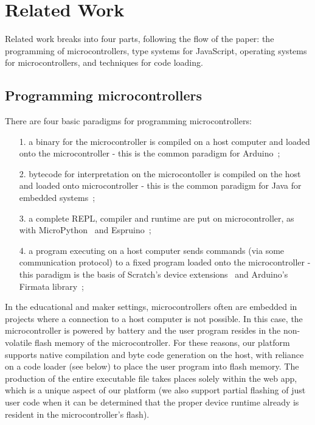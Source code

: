 \section{Related Work}
\label{sec:related}

Related work breaks into four parts, following the
flow of the paper: the programming of microcontrollers, 
type systems for JavaScript, operating systems
for microcontrollers, and techniques for code loading.

\subsection{Programming microcontrollers}

There are four basic paradigms for programming microcontrollers:
\begin{itemize}
\item[1.] a binary for the microcontroller is compiled on a host computer and loaded onto the microcontroller -
this is the common paradigm for Arduino~\cite{buildingArduino2014};
\item[2.] bytecode for interpretation on the microcontoller is compiled on the host and loaded onto microcontroller - 
this is the common paradigm for Java for embedded systems~\cite{ClausenTOPLAS};
\item[3.] a complete REPL, compiler and runtime are put on microcontroller, as with MicroPython~\cite{MicroPython} 
and Espruino~\cite{Espruino};
\item[4.] a program executing on a host computer sends commands (via some communication protocol) 
to a fixed program loaded onto the microcontroller - this paradigm is the basis of Scratch's
device extensions~\cite{ScratchCACM2009} and Arduino's Firmata library~\cite{Firmata};
\end{itemize}

In the educational and maker settings, microcontrollers often are embedded in projects where a 
connection to a host computer is not possible. In this case, the microcontroller is powered by battery and
the user program resides in the non-volatile flash memory of the microcontroller. For these
reasons, our platform supports native compilation and byte code generation on the host,
with reliance on a code loader (see below) to place the user program into flash memory. 
The production of the entire executable file
takes places solely within the web app, which is a unique aspect of our platform (we
also support partial flashing of just user code when it can be determined that the 
proper device runtime already is resident in the microcontroller's flash).

